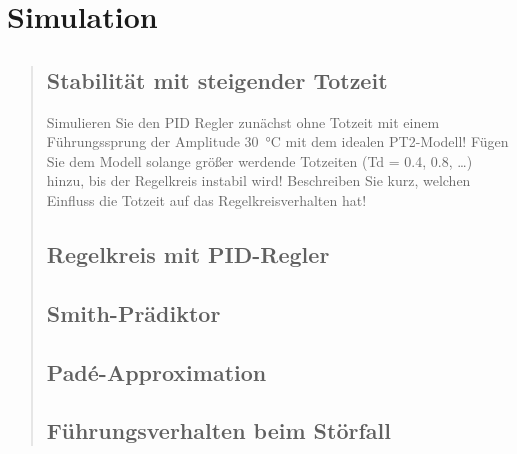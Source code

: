 

\section{Simulation}
\begin{quote}
    
    \subsection{Stabilität mit steigender Totzeit}
    Simulieren Sie den PID Regler zunächst ohne Totzeit mit einem Führungssprung der Amplitude
    \SI{+30}{\celsius} mit dem idealen PT2-Modell! Fügen Sie dem Modell solange größer werdende Totzeiten (Td = 0.4,
    0.8, \ldots) hinzu, bis der Regelkreis instabil wird! Beschreiben Sie kurz, welchen Einﬂuss die Totzeit auf das
    Regelkreisverhalten hat!
    \begin{quote}
        
    \end{quote}
    
    
    \subsection{Regelkreis mit PID-Regler}
    \begin{quote}
        
    \end{quote}
    
    
    \subsection{Smith-Prädiktor}
    \begin{quote}
        
    \end{quote}
    
    
    \subsection{Pad\'e-Approximation}
    \begin{quote}
        
    \end{quote}
    
    
    \subsection{Führungsverhalten beim Störfall}
    \begin{quote}
        
    \end{quote}
    
    
    
\end{quote}

